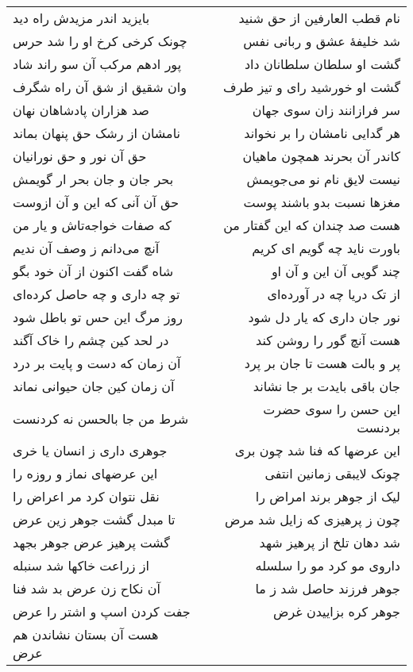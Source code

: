 \begin{center}
\begin{longtable}{l p{0.5cm} r}
بایزید اندر مزیدش راه دید
&&
نام قطب العارفین از حق شنید
\\
چونک کرخی کرخ او را شد حرس
&&
شد خلیفهٔ عشق و ربانی نفس
\\
پور ادهم مرکب آن سو راند شاد
&&
گشت او سلطان سلطانان داد
\\
وان شقیق از شق آن راه شگرف
&&
گشت او خورشید رای و تیز طرف
\\
صد هزاران پادشاهان نهان
&&
سر فرازانند زان سوی جهان
\\
نامشان از رشک حق پنهان بماند
&&
هر گدایی نامشان را بر نخواند
\\
حق آن نور و حق نورانیان
&&
کاندر آن بحرند همچون ماهیان
\\
بحر جان و جان بحر ار گویمش
&&
نیست لایق نام نو می‌جویمش
\\
حق آن آنی که این و آن ازوست
&&
مغزها نسبت بدو باشند پوست
\\
که صفات خواجه‌تاش و یار من
&&
هست صد چندان که این گفتار من
\\
آنچ می‌دانم ز وصف آن ندیم
&&
باورت ناید چه گویم ای کریم
\\
شاه گفت اکنون از آن خود بگو
&&
چند گویی آن این و آن او
\\
تو چه داری و چه حاصل کرده‌ای
&&
از تک دریا چه در آورده‌ای
\\
روز مرگ این حس تو باطل شود
&&
نور جان داری که یار دل شود
\\
در لحد کین چشم را خاک آگند
&&
هست آنچ گور را روشن کند
\\
آن زمان که دست و پایت بر درد
&&
پر و بالت هست تا جان بر پرد
\\
آن زمان کین جان حیوانی نماند
&&
جان باقی بایدت بر جا نشاند
\\
شرط من جا بالحسن نه کردنست
&&
این حسن را سوی حضرت بردنست
\\
جوهری داری ز انسان یا خری
&&
این عرضها که فنا شد چون بری
\\
این عرضهای نماز و روزه را
&&
چونک لایبقی زمانین انتفی
\\
نقل نتوان کرد مر اعراض را
&&
لیک از جوهر برند امراض را
\\
تا مبدل گشت جوهر زین عرض
&&
چون ز پرهیزی که زایل شد مرض
\\
گشت پرهیز عرض جوهر بجهد
&&
شد دهان تلخ از پرهیز شهد
\\
از زراعت خاکها شد سنبله
&&
داروی مو کرد مو را سلسله
\\
آن نکاح زن عرض بد شد فنا
&&
جوهر فرزند حاصل شد ز ما
\\
جفت کردن اسپ و اشتر را عرض
&&
جوهر کره بزاییدن غرض
\\
هست آن بستان نشاندن هم عرض
&&

\end{longtable}
\end{center}
